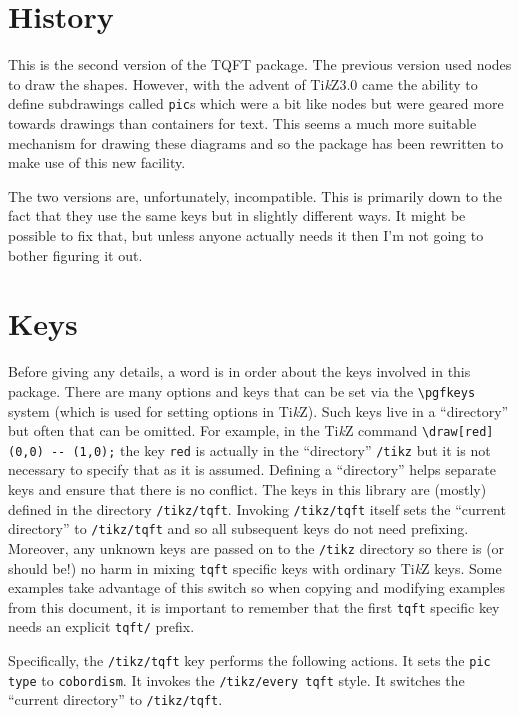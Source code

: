 \documentclass{ltxdoc}
\begin{document}
\section{History}

This is the second version of the TQFT package.
The previous version used nodes to draw the shapes.
However, with the advent of Ti\emph{k}Z3.0 came the ability to define subdrawings called \Verb+pic+s which were a bit like nodes but were geared more towards drawings than containers for text.
This seems a much more suitable mechanism for drawing these diagrams and so the package has been rewritten to make use of this new facility.

The two versions are, unfortunately, incompatible.
This is primarily down to the fact that they use the same keys but in slightly different ways.
It might be possible to fix that, but unless anyone actually needs it then I'm not going to bother figuring it out.


\section{Keys}

Before giving any details, a word is in order about the keys involved in this package.
There are many options and keys that can be set via the \Verb+\pgfkeys+ system (which is used for setting options in Ti\emph{k}Z).
Such keys live in a ``directory'' but often that can be omitted.
For example, in the Ti\emph{k}Z command \Verb+\draw[red] (0,0) -- (1,0);+ the key \Verb+red+ is actually in the ``directory'' \Verb+/tikz+ but it is not necessary to specify that as it is assumed.
Defining a ``directory'' helps separate keys and ensure that there is no conflict.
The keys in this library are (mostly) defined in the directory \Verb+/tikz/tqft+.
Invoking \Verb+/tikz/tqft+ itself sets the ``current directory'' to \Verb+/tikz/tqft+ and so all subsequent keys do not need prefixing.
Moreover, any unknown keys are passed on to the \Verb+/tikz+ directory so there is (or should be!) no harm in mixing \Verb+tqft+ specific keys with ordinary Ti\emph{k}Z keys.
Some examples take advantage of this switch so when copying and modifying examples from this document, it is important to remember that the first \Verb+tqft+ specific key needs an explicit \Verb+tqft/+ prefix.

Specifically, the \Verb+/tikz/tqft+ key performs the following actions.
It sets the \Verb+pic type+ to \Verb+cobordism+.
It invokes the \Verb+/tikz/every tqft+ style.
It switches the ``current directory'' to \Verb+/tikz/tqft+.
\end{document}
